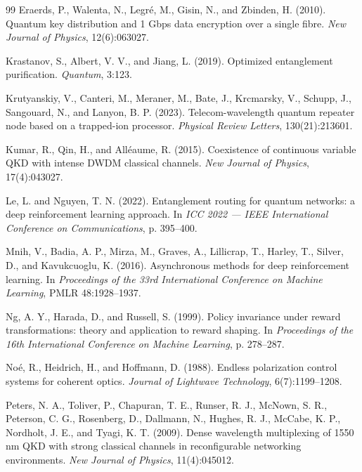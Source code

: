 \documentclass[12pt]{article}
\begin{document}
\begin{thebibliography}{99}
 Eraerds, P., Walenta, N., Legré, M., Gisin, N., and Zbinden, H.
(2010). Quantum key distribution and 1 Gbps data encryption over a single
fibre. \emph{New Journal of Physics}, 12(6):063027.

 Krastanov, S., Albert, V. V., and Jiang, L. (2019). Optimized
entanglement purification. \emph{Quantum}, 3:123.

 Krutyanskiy, V., Canteri, M., Meraner, M., Bate, J., Krcmarsky, V.,
Schupp, J., Sangouard, N., and Lanyon, B. P. (2023). Telecom-wavelength quantum
repeater node based on a trapped-ion processor. \emph{Physical Review
Letters}, 130(21):213601.

 Kumar, R., Qin, H., and Alléaume, R. (2015). Coexistence of continuous
variable QKD with intense DWDM classical channels. \emph{New Journal of
Physics}, 17(4):043027.

 Le, L. and Nguyen, T. N. (2022). Entanglement routing for quantum
networks: a deep reinforcement learning approach. In \emph{ICC 2022 --- IEEE
International Conference on Communications}, p. 395--400.

 Mnih, V., Badia, A. P., Mirza, M., Graves, A., Lillicrap, T., Harley,
T., Silver, D., and Kavukcuoglu, K. (2016). Asynchronous methods for deep
reinforcement learning. In \emph{Proceedings of the 33rd International
Conference on Machine Learning}, PMLR 48:1928--1937.

 Ng, A. Y., Harada, D., and Russell, S. (1999). Policy invariance under
reward transformations: theory and application to reward shaping. In
\emph{Proceedings of the 16th International Conference on Machine Learning},
p. 278--287.

 Noé, R., Heidrich, H., and Hoffmann, D. (1988). Endless polarization
control systems for coherent optics. \emph{Journal of Lightwave Technology},
6(7):1199--1208.

 Peters, N. A., Toliver, P., Chapuran, T. E., Runser, R. J., McNown,
S. R., Peterson, C. G., Rosenberg, D., Dallmann, N., Hughes, R. J., McCabe,
K. P., Nordholt, J. E., and Tyagi, K. T. (2009). Dense wavelength multiplexing
of 1550 nm QKD with strong classical channels in reconfigurable networking
environments. \emph{New Journal of Physics}, 11(4):045012.


\end{thebibliography}
\end{document}
